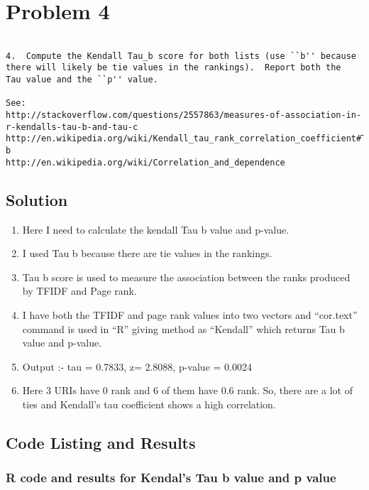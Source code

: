 

\section{Problem 4}
\label{part4}
\begin{verbatim}

4.  Compute the Kendall Tau_b score for both lists (use ``b'' because
there will likely be tie values in the rankings).  Report both the
Tau value and the ``p'' value.

See: 
http://stackoverflow.com/questions/2557863/measures-of-association-in-r-kendalls-tau-b-and-tau-c
http://en.wikipedia.org/wiki/Kendall_tau_rank_correlation_coefficient#Tau-b
http://en.wikipedia.org/wiki/Correlation_and_dependence

\end{verbatim}

\subsection{Solution}
\begin{enumerate}
\item Here I need to calculate the kendall Tau b value and p-value.
\item I used Tau b because there are tie values in the rankings.
\item Tau b  score is used to measure the association between the ranks produced by TFIDF and Page rank.
\item I have both the TFIDF and page rank values into two vectors and ``cor.text'' command is used in ``R''  giving method as ``Kendall'' which returns Tau b value and p-value.
\item Output :- tau = 0.7833, z= 2.8088, p-value = 0.0024
\item Here 3 URIs have 0 rank and 6 of them have 0.6 rank. So, there are a lot of ties and Kendall's tau coefficient shows a high correlation.
\end{enumerate}
\newpage
\subsection{Code Listing and Results}

\subsubsection{R code and results for Kendal's Tau b value and p value}

\newpage

